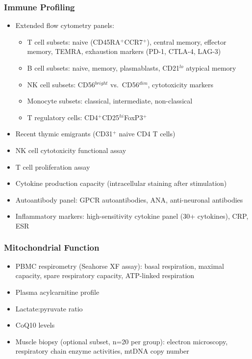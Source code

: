 \subsubsection{Immune Profiling}
\begin{itemize}
    \item Extended flow cytometry panels:
    \begin{itemize}
        \item T cell subsets: naive (CD45RA$^+$CCR7$^+$), central memory, effector memory, TEMRA, exhaustion markers (PD-1, CTLA-4, LAG-3)
        \item B cell subsets: naive, memory, plasmablasts, CD21$^{lo}$ atypical memory
        \item NK cell subsets: CD56$^{bright}$ vs.\ CD56$^{dim}$, cytotoxicity markers
        \item Monocyte subsets: classical, intermediate, non-classical
        \item T regulatory cells: CD4$^+$CD25$^{hi}$FoxP3$^+$
    \end{itemize}
    \item Recent thymic emigrants (CD31$^+$ naive CD4 T cells)
    \item NK cell cytotoxicity functional assay
    \item T cell proliferation assay
    \item Cytokine production capacity (intracellular staining after stimulation)
    \item Autoantibody panel: GPCR autoantibodies, ANA, anti-neuronal antibodies
    \item Inflammatory markers: high-sensitivity cytokine panel (30+ cytokines), CRP, ESR
\end{itemize}

\subsubsection{Mitochondrial Function}
\begin{itemize}
    \item PBMC respirometry (Seahorse XF assay): basal respiration, maximal capacity, spare respiratory capacity, ATP-linked respiration
    \item Plasma acylcarnitine profile
    \item Lactate:pyruvate ratio
    \item CoQ10 levels
    \item Muscle biopsy (optional subset, n=20 per group): electron microscopy, respiratory chain enzyme activities, mtDNA copy number
\end{itemize}

